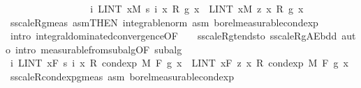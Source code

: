 \begin{isabellebody}
\ \ \ \ \ \ \ \ \ \isanewline
\ \ \ \ \ \ \isamarkupfalse%
\ {\isachardoublequoteopen}{\isacharparenleft}{\kern0pt}{\isasymlambda}i{\isachardot}{\kern0pt}\ LINT\ x{\isacharbar}{\kern0pt}M{\isachardot}{\kern0pt}\ s\ i\ x\ {\isacharasterisk}{\kern0pt}\isactrlsub R\ g\ x{\isacharparenright}{\kern0pt}\ {\isasymlonglonglongrightarrow}\ LINT\ x{\isacharbar}{\kern0pt}M{\isachardot}{\kern0pt}\ z\ x\ {\isacharasterisk}{\kern0pt}\isactrlsub R\ g\ x{\isachardoublequoteclose}\ \isamarkupfalse%
\ s{\isacharunderscore}{\kern0pt}scaleR{\isacharunderscore}{\kern0pt}g{\isacharunderscore}{\kern0pt}meas\ asm{\isacharparenleft}{\kern0pt}{}{\isacharparenright}{\kern0pt}{\isacharbrackleft}{\kern0pt}THEN\ integrable{\isacharunderscore}{\kern0pt}norm{\isacharbrackright}{\kern0pt}\ asm{\isacharprime}{\kern0pt}\ borel{\isacharunderscore}{\kern0pt}measurable{\isacharunderscore}{\kern0pt}cond{\isacharunderscore}{\kern0pt}exp{\isacharprime}{\kern0pt}\ \isamarkupfalse%
\ {\isacharparenleft}{\kern0pt}intro\ integral{\isacharunderscore}{\kern0pt}dominated{\isacharunderscore}{\kern0pt}convergence{\isacharbrackleft}{\kern0pt}OF\ {\isacharunderscore}{\kern0pt}\ {\isacharunderscore}{\kern0pt}\ {\isacharunderscore}{\kern0pt}\ s{\isacharunderscore}{\kern0pt}scaleR{\isacharunderscore}{\kern0pt}g{\isacharunderscore}{\kern0pt}tendsto\ s{\isacharunderscore}{\kern0pt}scaleR{\isacharunderscore}{\kern0pt}g{\isacharunderscore}{\kern0pt}AE{\isacharunderscore}{\kern0pt}bdd{\isacharbrackright}{\kern0pt}{\isacharparenright}{\kern0pt}\ {\isacharparenleft}{\kern0pt}auto\ intro{\isacharcolon}{\kern0pt}\ measurable{\isacharunderscore}{\kern0pt}from{\isacharunderscore}{\kern0pt}subalg{\isacharbrackleft}{\kern0pt}OF\ subalg{\isacharbrackright}{\kern0pt}{\isacharparenright}{\kern0pt}\isanewline
\ \ \ \ \ \ \isamarkupfalse%
\ \isamarkupfalse%
\ {\isachardoublequoteopen}{\isacharparenleft}{\kern0pt}{\isasymlambda}i{\isachardot}{\kern0pt}\ LINT\ x{\isacharbar}{\kern0pt}{\isacharquery}{\kern0pt}F{\isachardot}{\kern0pt}\ s\ i\ x\ {\isacharasterisk}{\kern0pt}\isactrlsub R\ cond{\isacharunderscore}{\kern0pt}exp\ M\ F\ g\ x{\isacharparenright}{\kern0pt}\ {\isasymlonglonglongrightarrow}\ LINT\ x{\isacharbar}{\kern0pt}{\isacharquery}{\kern0pt}F{\isachardot}{\kern0pt}\ z\ x\ {\isacharasterisk}{\kern0pt}\isactrlsub R\ cond{\isacharunderscore}{\kern0pt}exp\ M\ F\ g\ x{\isachardoublequoteclose}\ \isamarkupfalse%
\ s{\isacharunderscore}{\kern0pt}scaleR{\isacharunderscore}{\kern0pt}cond{\isacharunderscore}{\kern0pt}exp{\isacharunderscore}{\kern0pt}g{\isacharunderscore}{\kern0pt}meas\ asm{\isacharparenleft}{\kern0pt}{}{\isacharparenright}{\kern0pt}\ borel{\isacharunderscore}{\kern0pt}measurable{\isacharunderscore}{\kern0pt}cond{\isacharunderscore}{\kern0pt}exp{\isacharprime}{\kern0pt}\ \isamarkupfalse%

\end{isabellebody}
